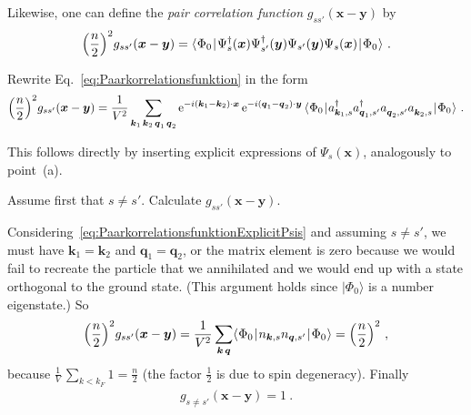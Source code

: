 \documentclass[11pt,a4paper]{article}
\newcommand{\ee}{{\mathrm{e}}}
\newcommand{\ket}[1]{\lvert#1\rangle}
\newcommand{\matrixel}[3]{\langle\hspace{0.15mm}#1\hspace{0.25mm}\vert\hspace{0.25mm} #2
  \hspace{0.25mm}\vert\hspace{0.25mm}#3\hspace{0.15mm}\rangle}
\newcommand{\boldx}{{\boldsymbol x}}
\newcommand{\boldy}{{\boldsymbol y}}
\newcommand{\boldk}{{\boldsymbol k}}
\newcommand{\boldq}{{\boldsymbol q}}
\newcommand{\nodagger}{{\vphantom{\dagger}}} %
\begin{document}
\begin{exenumerate}
\begin{loesung}
  \end{loesung}
\end{exenumerate}

Likewise, one can define the \emph{pair correlation function} $g_{ss'}(\boldx-\boldy)$ by
\begin{align}
  \label{eq:Paarkorrelationsfunktion}
  \Bigl(\frac{n}{2}\Bigr)^2 g_{ss'}(\boldx-\boldy)
  = \matrixel{\Phi_0}{\Psi_s^\dagger(\boldx) \Psi_{s'}^\dagger(\boldy) \Psi_{s'}(\boldy)\Psi_s(\boldx)}{\Phi_0}\ .
\end{align}

\begin{exenumerate}
\item Rewrite Eq.~\eqref{eq:Paarkorrelationsfunktion} in the form
  \begin{align}
    \label{eq:PaarkorrelationsfunktionExplicitPsis}
    \Bigl(\frac{n}{2}\Bigr)^2 g_{ss'}(\boldx-\boldy)
    = \frac1{V^2}\sum_{\boldk_1\,\boldk_2\,\boldq_1\,\boldq_2}
    \ee^{-i\left(\boldk_1-\boldk_2\right)\cdot\boldx}\, \ee^{-i\left(\boldq_1-\boldq_2\right)\cdot\boldy}\,
    \matrixel{\Phi_0}{a^\dagger_{\boldk_1,s} a^\dagger_{\boldq_1,s'}
      a^\nodagger_{\boldq_2,s'} a^\nodagger_{\boldk_2,s} }{\Phi_0}\ .
  \end{align}

  \begin{loesung}
    This follows directly by inserting explicit expressions of $\Psi_s(\boldx)$, analogously to point~(a).
  \end{loesung}
  
\item Assume first that $s\neq s'$. Calculate $g_{ss'}(\boldx-\boldy)$.
  
  \begin{loesung}
    Considering~\eqref{eq:PaarkorrelationsfunktionExplicitPsis} and assuming $s\neq s'$, we must
    have $\boldk_1=\boldk_2$
    and $\boldq_1 = \boldq_2$, or the matrix element is zero because we would fail to recreate the particle
    that we annihilated and we would end up with a state orthogonal to the ground state. (This argument holds
    since $\ket{\Phi_0}$ is a number eigenstate.) So
    \begin{align}
      \Bigl(\frac{n}{2}\Bigr)^2 g_{ss'}(\boldx-\boldy)
      = \frac1{V^2}\sum_{\boldk\,\boldq}\matrixel{\Phi_0}{n_{\boldk,s} n_{\boldq,s'}}{\Phi_0}
      = \Bigl(\frac{n}{2}\Bigr)^2\ ,
    \end{align}
    because $\frac{1}{V}\,\sum_{k<k_F}1 = \frac{n}{2}$ (the factor $\frac12$ is due to spin degeneracy).
    Finally
    \begin{align}
      g_{s\neq s'}\left(\boldx-\boldy\right) = 1\ .
    \end{align}
  \end{loesung}
  

\end{exenumerate}
\end{document}
